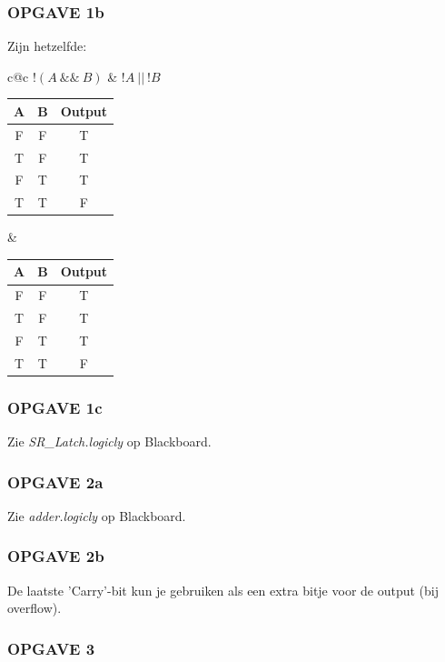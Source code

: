 \subsubsection{OPGAVE 1b}

Zijn hetzelfde:
\begin{center}
\begin{tabular}{c@{\qquad \qquad \qquad}c}
    $!(A\ \&\&\ B)$   &   $!A\ ||\ !B$ \\
    \begin{tabular}[t]{|c|c|c|}
        \hline
        A & B & Output \\
        \hline \hline
        F & F & T \\
        T & F & T \\
        F & T & T \\
        T & T & F \\
        \hline
    \end{tabular}
    &
    \begin{tabular}[t]{|c|c|c|}
        \hline
        A & B & Output \\
        \hline \hline
        F & F & T \\
        T & F & T \\
        F & T & T \\
        T & T & F \\
        \hline
    \end{tabular}
\end{tabular}
\end{center}

\subsubsection{OPGAVE 1c}

Zie \textit{SR\_Latch.logicly} op Blackboard.

\subsubsection{OPGAVE 2a}

Zie \textit{adder.logicly} op Blackboard.

\subsubsection{OPGAVE 2b}

De laatste 'Carry'-bit kun je gebruiken als een extra bitje voor de output (bij overflow).

\subsubsection{OPGAVE 3}

